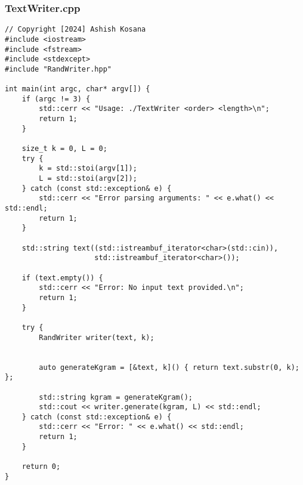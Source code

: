 \documentclass[12pt]{article}
\begin{document}
\subsubsection{TextWriter.cpp}
\begin{lstlisting}[style=cppcode]
// Copyright [2024] Ashish Kosana
#include <iostream>
#include <fstream>
#include <stdexcept>
#include "RandWriter.hpp"

int main(int argc, char* argv[]) {
    if (argc != 3) {
        std::cerr << "Usage: ./TextWriter <order> <length>\n";
        return 1;
    }

    size_t k = 0, L = 0;
    try {
        k = std::stoi(argv[1]);
        L = std::stoi(argv[2]);
    } catch (const std::exception& e) {
        std::cerr << "Error parsing arguments: " << e.what() << std::endl;
        return 1;
    }

    std::string text((std::istreambuf_iterator<char>(std::cin)),
                     std::istreambuf_iterator<char>());

    if (text.empty()) {
        std::cerr << "Error: No input text provided.\n";
        return 1;
    }

    try {
        RandWriter writer(text, k);


        auto generateKgram = [&text, k]() { return text.substr(0, k); };

        std::string kgram = generateKgram();
        std::cout << writer.generate(kgram, L) << std::endl;
    } catch (const std::exception& e) {
        std::cerr << "Error: " << e.what() << std::endl;
        return 1;
    }

    return 0;
}
\end{lstlisting}
\end{document}
